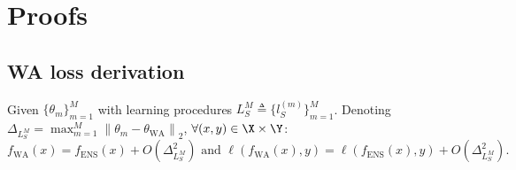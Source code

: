 \section{Proofs}
\label{app:proof}

\subsection{WA loss derivation}
\label{app:wa_loss}
\begin{lemma*}[\ref{lemma:wa_ensembling}]
    Given $\{\theta_m\}_{m=1}^M$ with learning procedures $L_S^M\triangleq\{l_S^{(m)}\}_{m=1}^M$. Denoting $\Delta_{L_S^M}=\max_{m=1}^{M}\left\|\theta_m-\theta_{\text{WA}}\right\|_2$, $\forall (x,y) \in \X \times \Y$:%
    \begin{equation*}
        f_{\text{WA}}(x) = f_{\text{ENS}}(x) + O(\Delta^2_{L_S^M}) \text{~and~} \ell\left(f_{\text{WA}}(x), y\right) = \ell\left(f_{\text{ENS}}(x) , y\right) + O(\Delta_{L_S^M}^2).%
    \end{equation*}%
\end{lemma*}
